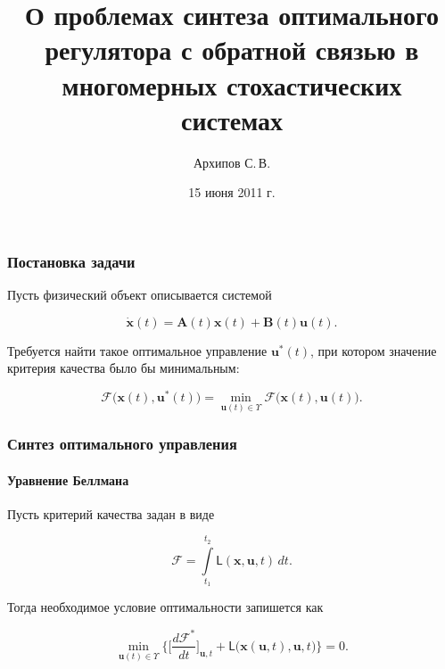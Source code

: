 \documentclass[ignorenonframetext,hyperref={pdftex,unicode},compress]{beamer}
\title{О проблемах синтеза оптимального регулятора с обратной связью в многомерных стохастических системах}
\author{Архипов С.\,В.}
\institute{Научный руководитель: Пакшин П.\,В.}
\date{15 июня 2011 г.}
\begin{document}
\begin{frame}
    \titlepage
\end{frame}



\begin{frame}
	\frametitle{Постановка задачи}

    Пусть физический объект описывается системой

	\begin{equation}\label{eq:1}
	    \dot{\mathbf{x}}(t) = \mathbf{A}(t)\mathbf{x}(t) + \mathbf{B}(t)\mathbf{u}(t) \text{.}
	\end{equation}

	Требуется найти такое оптимальное управление $\mathbf{u}^*(t)$, при котором значение критерия качества было бы минимальным:
	
	\begin{equation}\label{eq:2}
	    \mathcal{F} \bigl(  \mathbf{x}(t), \mathbf{u}^*(t)  \bigr) = \min_{\mathbf{u}(t) \in \Upsilon} \mathcal{F} \bigl(  \mathbf{x}(t), \mathbf{u}(t)  \bigr)  \text{.}
	\end{equation}
\end{frame}



\begin{frame}
	\frametitle{Синтез оптимального управления}
	\framesubtitle{Уравнение Беллмана}

    Пусть критерий качества задан в виде
    
    \begin{equation}\label{eq:3}
    	\mathcal{F} = \int\limits_{t_1}^{t_2} \mathsf{L}(\mathbf{x}, \mathbf{u}, t)\,dt \text{.}
    \end{equation}
    
    Тогда необходимое условие оптимальности запишется как
    
    \begin{equation}\label{eq:4}
    	\underset{\mathbf{u}(t) \in \Upsilon}{\min} \biggl\{ \biggl[ \frac{d \mathcal{F}^*}{d t} \biggr]_{\mathbf{u}, t} + \mathsf{L}\bigl(  \mathbf{x}(\mathbf{u}, t), \mathbf{u}, t  \bigr) \biggr\} = 0 \text{.}
    \end{equation}
\end{frame}
\end{document}
